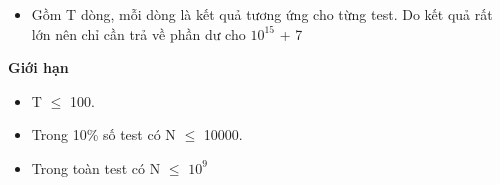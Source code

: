 \begin{itemize}
	\item Gồm T dòng, mỗi dòng là kết quả tương ứng cho từng test. Do kết quả rất lớn nên chỉ cần trả về phần dư cho $10^{15}$ + 7
\end{itemize}

\textbf{Giới hạn }
\begin{itemize}
	\item T  $\le$  100.
	\item Trong 10\% số test có N  $\le$  10000.
	\item Trong toàn test có N  $\le$  $10^{9}$
\end{itemize}
